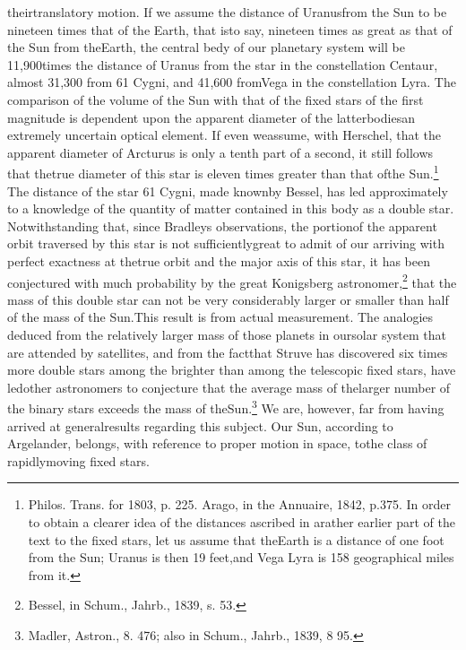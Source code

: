 theirtranslatory motion. If we assume the distance of Uranusfrom the Sun to be nineteen times that of the Earth, that isto say, nineteen times as great as that of the Sun from theEarth, the central bedy of our planetary system will be 11,900times the distance of Uranus from the star  in the constellation Centaur, almost 31,300 from 61 Cygni, and 41,600 fromVega in the constellation Lyra. The comparison of the volume of the Sun with that of the fixed stars of the first magnitude is dependent upon the apparent diameter of the latterbodiesan extremely uncertain optical element. If even weassume, with Herschel, that the apparent diameter of Arcturus is only a tenth part of a second, it still follows that thetrue diameter of this star is eleven times greater than that ofthe Sun.\footnote{Philos. Trans. for 1803, p. 225. Arago, in the Annuaire, 1842, p.375. In order to obtain a clearer idea of the distances ascribed in arather earlier part of the text to the fixed stars, let us assume that theEarth is a distance of one foot from the Sun; Uranus is then 19 feet,and Vega Lyra is 158 geographical miles from it.} The distance of the star 61 Cygni, made knownby Bessel, has led approximately to a knowledge of the quantity of matter contained in this body as a double star. Notwithstanding that, since Bradleys observations, the portionof the apparent orbit traversed by this star is not sufficientlygreat to admit of our arriving with perfect exactness at thetrue orbit and the major axis of this star, it has been conjectured with much probability by the great Konigsberg astronomer,\footnote{Bessel, in Schum., Jahrb., 1839, s. 53.} that the mass of this double star can not be very considerably larger or smaller than half of the mass of the Sun.This result is from actual measurement. The analogies deduced from the relatively larger mass of those planets in oursolar system that are attended by satellites, and from the factthat Struve has discovered six times more double stars among the brighter than among the telescopic fixed stars, have ledother astronomers to conjecture that the average mass of thelarger number of the binary stars exceeds the mass of theSun.\footnote{Madler, Astron., 8. 476; also in Schum., Jahrb., 1839, 8 95.} We are, however, far from having arrived at generalresults regarding this subject. Our Sun, according to Argelander, belongs, with reference to proper motion in space, tothe class of rapidlymoving fixed stars.

